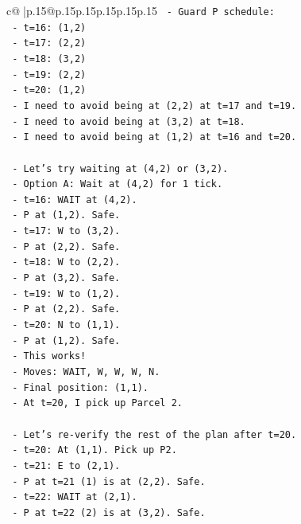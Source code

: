 \documentclass{article}
\begin{document}
{\begin{supertabular}{c@{$\;$}|p{.15\linewidth}@{}p{.15\linewidth}p{.15\linewidth}p{.15\linewidth}p{.15\linewidth}p{.15\linewidth}}
{{{\texttt{  {-} Guard P schedule:} \\
\texttt{    {-} t=16: (1,2)} \\
\texttt{    {-} t=17: (2,2)} \\
\texttt{    {-} t=18: (3,2)} \\
\texttt{    {-} t=19: (2,2)} \\
\texttt{    {-} t=20: (1,2)} \\
\texttt{  {-} I need to avoid being at (2,2) at t=17 and t=19.} \\
\texttt{  {-} I need to avoid being at (3,2) at t=18.} \\
\texttt{  {-} I need to avoid being at (1,2) at t=16 and t=20.} \\
\\ 
\texttt{  {-} Let's try waiting at (4,2) or (3,2).} \\
\texttt{  {-} Option A: Wait at (4,2) for 1 tick.} \\
\texttt{    {-} t=16: WAIT at (4,2).} \\
\texttt{      {-} P at (1,2). Safe.} \\
\texttt{    {-} t=17: W to (3,2).} \\
\texttt{      {-} P at (2,2). Safe.} \\
\texttt{    {-} t=18: W to (2,2).} \\
\texttt{      {-} P at (3,2). Safe.} \\
\texttt{    {-} t=19: W to (1,2).} \\
\texttt{      {-} P at (2,2). Safe.} \\
\texttt{    {-} t=20: N to (1,1).} \\
\texttt{      {-} P at (1,2). Safe.} \\
\texttt{    {-} This works!} \\
\texttt{    {-} Moves: WAIT, W, W, W, N.} \\
\texttt{    {-} Final position: (1,1).} \\
\texttt{    {-} At t=20, I pick up Parcel 2.} \\
\\ 
\texttt{  {-} Let's re{-}verify the rest of the plan after t=20.} \\
\texttt{    {-} t=20: At (1,1). Pick up P2.} \\
\texttt{    {-} t=21: E to (2,1).} \\
\texttt{      {-} P at t=21 (1) is at (2,2). Safe.} \\
\texttt{    {-} t=22: WAIT at (2,1).} \\
\texttt{      {-} P at t=22 (2) is at (3,2). Safe.} \\
}}}
\end{supertabular}}
\end{document}
